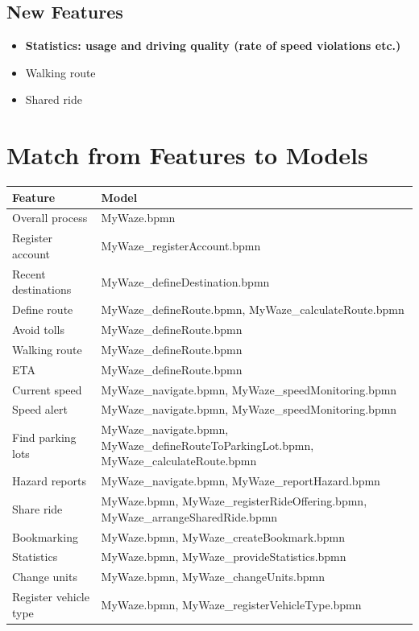 \documentclass{article}
\begin{document}
\subsection*{New Features}
\begin{itemize}
    \item \textbf{Statistics: usage and driving quality (rate of speed violations etc.)}
    \item Walking route
    \item Shared ride
\end{itemize}

\section*{Match from Features to Models}

\begin{longtable}{|>{\raggedright}p{}|>{\raggedright\arraybackslash}p{}|}
\hline
\textbf{Feature} & \textbf{Model} \\
\hline
Overall process & MyWaze.bpmn \\
\hline
Register account & MyWaze\_registerAccount.bpmn \\
\hline
Recent destinations & MyWaze\_defineDestination.bpmn \\
\hline
Define route & MyWaze\_defineRoute.bpmn, MyWaze\_calculateRoute.bpmn \\
\hline
Avoid tolls & MyWaze\_defineRoute.bpmn \\
\hline
Walking route & MyWaze\_defineRoute.bpmn \\
\hline
ETA & MyWaze\_defineRoute.bpmn \\
\hline
Current speed & MyWaze\_navigate.bpmn, MyWaze\_speedMonitoring.bpmn \\
\hline
Speed alert & MyWaze\_navigate.bpmn, MyWaze\_speedMonitoring.bpmn \\
\hline
Find parking lots & MyWaze\_navigate.bpmn, MyWaze\_defineRouteToParkingLot.bpmn, MyWaze\_calculateRoute.bpmn \\
\hline
Hazard reports & MyWaze\_navigate.bpmn, MyWaze\_reportHazard.bpmn \\
\hline
Share ride & MyWaze.bpmn, MyWaze\_registerRideOffering.bpmn, MyWaze\_arrangeSharedRide.bpmn \\
\hline
Bookmarking & MyWaze.bpmn, MyWaze\_createBookmark.bpmn \\
\hline
Statistics & MyWaze.bpmn, MyWaze\_provideStatistics.bpmn \\
\hline
Change units & MyWaze.bpmn, MyWaze\_changeUnits.bpmn \\
\hline
Register vehicle type & MyWaze.bpmn, MyWaze\_registerVehicleType.bpmn \\
\hline
\end{longtable}
\end{document}
